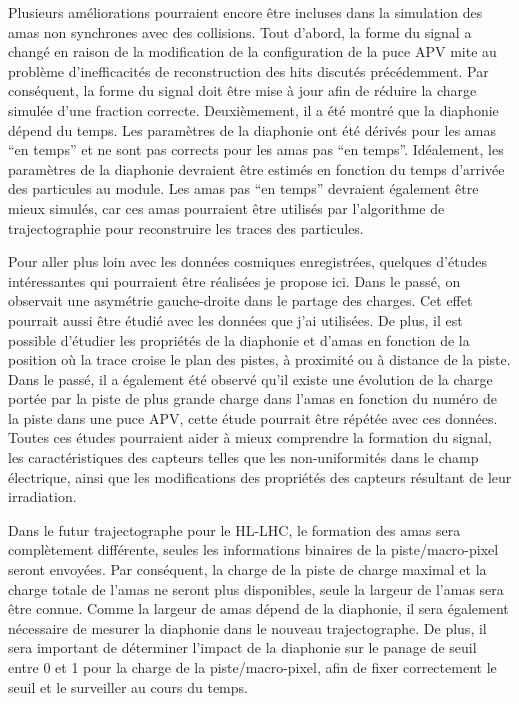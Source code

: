 Plusieurs améliorations pourraient encore être incluses dans la simulation des amas non synchrones avec des collisions. Tout d'abord, la forme du signal a changé en raison de la modification de la configuration de la puce APV mite au problème d'inefficacités de reconstruction des hits discutés précédemment. Par conséquent, la forme du signal doit être mise à jour afin de réduire la charge simulée d'une fraction correcte. Deuxièmement, il a été montré que la diaphonie dépend du temps. Les paramètres de la diaphonie ont été dérivés pour les amas ``en temps'' et ne sont pas corrects pour les amas pas ``en temps''. Idéalement, les paramètres de la diaphonie devraient être estimés en fonction du temps d'arrivée des particules au module. Les amas pas ``en temps'' devraient également être mieux simulés, car ces amas pourraient être utilisés par l’algorithme de trajectographie pour reconstruire les traces des particules.


Pour aller plus loin avec les données cosmiques enregistrées, quelques d’études intéressantes qui pourraient être réalisées je propose ici. Dans le passé, on observait une asymétrie gauche-droite dans le partage des charges. Cet effet pourrait aussi être étudié avec les données que j'ai utilisées. De plus, il est possible d'étudier les propriétés de la diaphonie et d'amas en fonction de la position où la trace croise le plan des pistes, à proximité ou à distance de la piste. Dans le passé, il a également été observé qu’il existe une évolution de la charge portée par la piste de plus grande charge dans l'amas en fonction du numéro de la piste dans une puce APV, cette étude pourrait être répétée avec ces données. Toutes ces études pourraient aider à mieux comprendre la formation du signal, les caractéristiques des capteurs telles que les non-uniformités dans le champ électrique, ainsi que les modifications des propriétés des capteurs résultant de leur irradiation.

Dans le futur trajectographe pour le HL-LHC, le formation des amas sera complètement différente, seules les informations binaires de la piste/macro-pixel seront envoyées. Par conséquent, la charge de la piste de charge maximal et la charge totale de l'amas ne seront plus disponibles, seule la largeur de l'amas sera être connue. Comme la largeur de amas dépend de la diaphonie, il sera également nécessaire de mesurer la diaphonie dans le nouveau trajectographe. De plus, il sera important de déterminer l'impact de la diaphonie sur le panage de seuil entre 0 et 1 pour la charge de la piste/macro-pixel, afin de fixer correctement le seuil et le surveiller au cours du temps.

